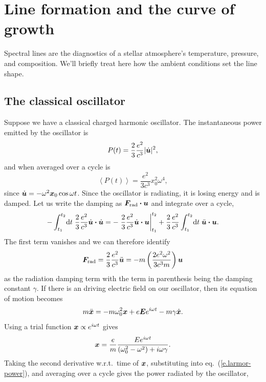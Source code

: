 \section{Line formation and the curve of growth}\label{s.curve-of-growth}

Spectral lines are the diagnostics of a stellar atmosphere's temperature, pressure, and composition.  We'll briefly treat here how the ambient conditions set the line shape.

\subsection{The classical oscillator}\label{s.classical-oscillator}

Suppose we have a classical charged harmonic oscillator.  The instantaneous power emitted by the oscillator is
\begin{equation}\label{e.larmor-power}
	 P(t) = \frac{2}{3}\frac{e^{2}}{c^{3}} |\dot{\boldsymbol{u}}|^{2},
\end{equation}
and when averaged over a cycle is
\begin{equation}\label{e.oscillator-power}
	 \left\langle P(t) \right\rangle = \frac{e^{2}}{3c^{3}}x_{0}^{2} \omega^{4},
\end{equation}
since $\dot{\boldsymbol{u}} = -\omega^{2}\boldsymbol{x}_{0}\cos \omega t$. Since the oscillator is radiating, it is losing energy and is damped. Let us write the damping as $\boldsymbol{F}_{\mathrm{rad}}\boldsymbol{\cdot} \boldsymbol{u}$ and integrate over a cycle,
\[  -\int_{t_{1}}^{t_{2}}\!\mathrm{d} t\;\frac{2}{3}\frac{e^{2}}{c^{3}}\dot{\boldsymbol{u}}\boldsymbol{\cdot}\dot{\boldsymbol{u}} 
	= -\left.\frac{2}{3}\frac{e^{2}}{c^{3}}\dot{\boldsymbol{u}}\boldsymbol{\cdot}\boldsymbol{u}\right|_{t_{1}}^{t_{2}} 
	+ \frac{2}{3}\frac{e^{2}}{c^{3}} \int_{t_{1}}^{t_{2}}\!\mathrm{d} t\;\ddot{\boldsymbol{u}}\boldsymbol{\cdot}\boldsymbol{u}. 
\]
The first term vanishes and we can therefore identify 
\[ 
	\boldsymbol{F}_{\mathrm{rad}} = \frac{2}{3}\frac{e^{2}}{c^{3}}\ddot{\boldsymbol{u}} 
	= -m\left(\frac{2e^{2}\omega^{2}}{3c^{3}m}\right)\boldsymbol{u}
\]
as the radiation damping term with the term in parenthesis being the damping constant $\gamma$. 
If there is an driving electric field on our oscillator, then its equation of motion becomes
\begin{equation}\label{e.eq-sho}
	m\ddot{\boldsymbol{x}} = -m\omega_{0}^{2}\boldsymbol{x} + e\boldsymbol{E}e^{i\omega t} - m\gamma \dot{\boldsymbol{x}}.
\end{equation}
Using a trial function $\boldsymbol{x}\propto e^{i\omega t}$ gives
\[
	\boldsymbol{x} = \frac{e}{m}\frac{E e^{i\omega t}}{(\omega_{0}^{2}-\omega^{2}) + i\omega\gamma}.
\]
Taking the second derivative w.r.t.\ time of $\boldsymbol{x}$, substituting into eq.~(\ref{e.larmor-power}), and averaging over a cycle gives the power radiated by the oscillator,
